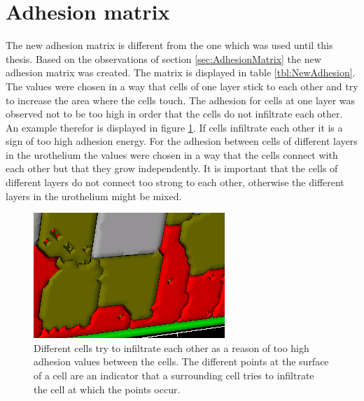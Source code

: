 \section{Adhesion matrix}
The new adhesion matrix is different from the one which was used until this thesis. Based on the observations of section \ref{sec:AdhesionMatrix} the new adhesion matrix was created. The matrix is displayed in table \ref{tbl:NewAdhesion}. The values were chosen in a way that cells of one layer stick to each other and try to increase the area where the cells touch. The adhesion for cells at one layer was observed not to be too high in order that the cells do not infiltrate each other. An example therefor is displayed in figure \ref{img:InfiltratingCells}. If cells infiltrate each other it is a sign of too high adhesion energy. For the adhesion between cells of different layers in the urothelium the values were chosen in a way that the cells connect with each other but that they grow independently. It is important that the cells of different layers do not connect too strong to each other, otherwise the different layers in the urothelium might be mixed. 

\begin{figure}[H]
	\center
	\includegraphics[scale=1.2]{figures/TooHighAdhesion1.png}
	\caption[Different cells try to infiltrate each other]{Different cells try to infiltrate each other as a reason of too high adhesion values between the cells. The different points at the surface of a cell are an indicator that a surrounding cell tries to infiltrate the cell at which the points occur.}
	\label{img:InfiltratingCells}
\end{figure}


